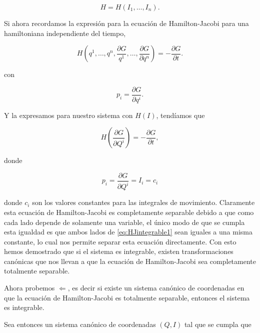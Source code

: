 \documentclass[a4paper,10pt]{article}
\numberwithin{equation}{section}
\begin{document}
\begin{equation}
 H = H(I_1,\dots,I_n).
\end{equation}

Si ahora recordamos la expresión para la ecuación de Hamilton-Jacobi para una hamiltoniana 
independiente del tiempo, 

\begin{equation}
 H(q^1, \dots, q^n, \frac{\partial G}{q^1}, \dots, \frac{\partial G}{\partial q^n}) 
 = - \frac{\partial G}{\partial t}.
\end{equation}

con 

\begin{equation}
 p_i = \frac{\partial G}{\partial q^i}.
\end{equation}

Y la expresamos para nuestro sistema con $H(I)$, tendíamos que 

\begin{equation}
 H\left(\frac{\partial G}{\partial Q^i}\right) = -\frac{\partial G}{\partial t},
 \label{eq:HJintegrable1}
\end{equation}

donde 

\begin{equation}
 p_i = \frac{\partial G}{\partial Q^i} = I_i = c_i
\end{equation}

donde $c_i$ son los valores constantes para las integrales de movimiento. Claramente 
esta ecuación de Hamilton-Jacobi es completamente separable debido a que como cada 
lado depende de solamente una variable, el único modo de que se cumpla esta igualdad 
es que ambos lados de \eqref{eq:HJintegrable1} sean iguales a una misma constante, lo 
cual nos permite separar esta ecuación directamente. Con esto hemos demostrado que 
si el sistema es integrable, existen transformaciones canónicas que nos llevan a 
que la ecuación de Hamilton-Jacobi sea completamente totalmente separable.

\vspace{.3cm}

Ahora probemos $\Leftarrow$, es decir si existe un sistema canónico de coordenadas en que 
la ecuación de Hamilton-Jacobi es totalmente separable, entonces el sistema es integrable. 

\vspace{.3cm}

Sea entonces un sistema canónico de coordenadas $(Q,I)$ tal que se cumpla que 
\end{document}
